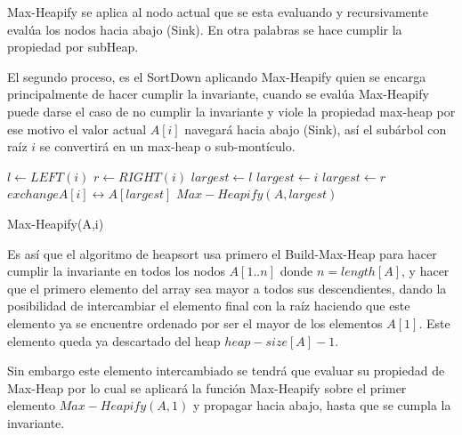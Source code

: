 \documentclass{article}
\begin{document}
                    Max-Heapify se aplica al nodo actual que se esta evaluando y recursivamente eval\'{u}a los nodos hacia abajo (Sink). En otra palabras se hace cumplir la propiedad por subHeap.
                        
                    El segundo proceso, es el SortDown aplicando Max-Heapify quien se encarga principalmente de hacer cumplir la invariante, cuando se eval\'{u}a Max-Heapify puede darse el caso de no cumplir la invariante y viole la propiedad max-heap por ese motivo el valor actual $A[i]$ navegar\'{a} hacia abajo (Sink), as\'{i} el sub\'{a}rbol con ra\'{i}z $i$ se convertir\'{a} en un max-heap o sub-mont\'{i}culo.
                        
                    \begin{algorithm}[H]
                        \begin{algorithmic}[1]
                            \STATE $l \leftarrow LEFT(i)$
                            \STATE $r \leftarrow RIGHT(i)$
                                \STATE $largest \leftarrow l$
                            \ELSE
                                \STATE $largest \leftarrow i$
                            \ENDIF
                                \STATE $largest \leftarrow r$
                            \ENDIF
                                \STATE $exchange A[i] \leftrightarrow A[largest]$
                                \STATE $Max-Heapify(A, largest)$
                            \ENDIF
                        \end{algorithmic}
                        \caption{Max-Heapify(A,i)}
                        \label{alg:max-heapify}
                    \end{algorithm}
    		         
    		        Es as\'{i} que el algoritmo de heapsort usa primero el Build-Max-Heap para hacer cumplir la invariante en todos los nodos $A[1..n]$ donde $n=length[A]$, y hacer que el primero elemento del array sea mayor a todos sus descendientes, dando la posibilidad de intercambiar el elemento final con la ra\'{i}z haciendo que este elemento ya se encuentre ordenado por ser el mayor de los elementos $A[1]$. Este elemento queda ya descartado del heap $heap-size[A] - 1$.
    		         
    		        Sin embargo este elemento intercambiado se tendr\'{a} que evaluar su propiedad de Max-Heap por lo cual se aplicar\'{a} la funci\'{o}n Max-Heapify sobre el primer elemento $Max-Heapify(A,1)$ y propagar hacia abajo, hasta que se cumpla la invariante.
    		         
\end{document}
